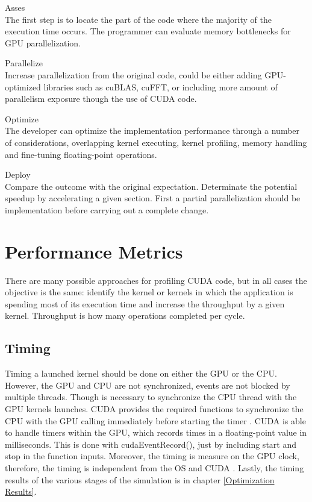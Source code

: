 \begin{description}

 \item{Asses} \hfill \\
 The first step is to locate the part of the code where the majority of the execution time occurs. The programmer can evaluate memory bottlenecks for GPU parallelization.
 \item{Parallelize} \hfill \\
 Increase parallelization from the original code, could be either adding GPU-optimized libraries such as cuBLAS, cuFFT, or including more amount of parallelism exposure though the use of CUDA code.
 \item{Optimize} \hfill \\
The developer can optimize the implementation performance through a number of considerations, overlapping kernel executing, kernel profiling, memory handling and fine-tuning floating-point operations.
 \item{Deploy} \hfill \\
 Compare the outcome with the original expectation. Determinate the potential speedup by accelerating a given section. First a partial parallelization should be implementation before carrying out a complete change.
 \end{description}

\section{Performance Metrics}

There are many possible approaches for profiling CUDA code, but in all cases the objective is the same:  identify the kernel or kernels in which the application is spending most of its execution time and increase the throughput by a given kernel. Throughput is how many operations completed per cycle.

\subsection{Timing}

Timing a launched kernel should be done on either the GPU or the CPU. However, the GPU and CPU are not synchronized, events are not blocked by multiple threads. Though is necessary to synchronize the CPU thread with the GPU kernels launches. CUDA provides the required  functions to synchronize the CPU with the GPU calling immediately before starting the timer \cite{practices}. CUDA is able to handle timers within the GPU, which records times in a floating-point value in milliseconds. This is done with {\listf cudaEventRecord()}, just by including {\listf start} and {\listf stop } in the function inputs. Moreover, the timing is measure on the GPU clock, therefore, the timing is independent from the OS and CUDA \cite{cook}. Lastly, the timing results of the various stages of the simulation is in chapter \ref{Optimization Results}.

